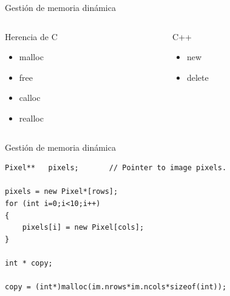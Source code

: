 \documentclass[aspectratio=169,presentation]{beamer}
\begin{document}
\begin{frame}[label={sec:org950a301}]{Gestión de memoria dinámica}
\begin{columns}
\begin{column}{0.48\columnwidth}
\begin{block}{Herencia de C}
\begin{itemize}
\item malloc
\item free
\item calloc
\item realloc
\end{itemize}
\end{block}
\end{column}
\begin{column}{0.48\columnwidth}
\begin{block}{C++}
\begin{itemize}
\item new
\item delete
\end{itemize}
\end{block}
\end{column}
\end{columns}
\end{frame}
\begin{frame}[label={sec:orgc171c7e},fragile]{Gestión de memoria dinámica}
 \begin{verbatim}
Pixel**   pixels;       // Pointer to image pixels.

pixels = new Pixel*[rows];
for (int i=0;i<10;i++)
{
	pixels[i] = new Pixel[cols];
}		

int * copy;

copy = (int*)malloc(im.nrows*im.ncols*sizeof(int));
\end{verbatim}
\end{frame}
\end{document}
